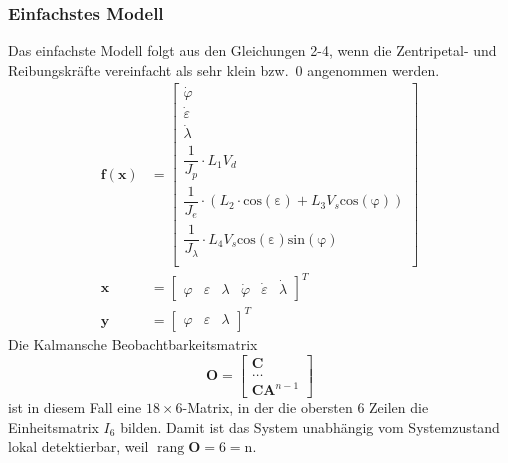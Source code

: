 \documentclass[times, 9pt,twocolumn]{article}
\DeclareMathOperator{\rang}{rang}
\begin{document}
	\subsubsection{Einfachstes Modell}
	Das einfachste Modell folgt aus den Gleichungen 2-4, wenn die Zentripetal- und Reibungskräfte vereinfacht als sehr klein bzw.\ 0 angenommen werden.
	\begin{align*}
	\bm f(\bm x) &= \begin{bmatrix}
	\dot \varphi \\
	\dot \varepsilon \\
	\dot \lambda  \\
	\dfrac{1}{J_p} \cdot L_1 V_d \\
	\dfrac{1}{J_e} \cdot (L_2 \cdot \mathrm{cos(\varepsilon)} + L_3 V_s \mathrm{cos(\varphi)}) \\
	\dfrac{1}{J_{\lambda}} \cdot L_4 V_s \mathrm{cos(\varepsilon)} \mathrm{sin(\varphi)} \\
	\end{bmatrix}\\
	\bm x &= \begin{bmatrix}
	\varphi & \varepsilon & \lambda & \dot \varphi & \dot \varepsilon & \dot \lambda 
	\end{bmatrix}^T \\
	\bm y &= \begin{bmatrix}
	\varphi & \varepsilon & \lambda 
	\end{bmatrix}^T
\end{align*}
	Die Kalmansche Beobachtbarkeitsmatrix
	$$\bm O = \begin{bmatrix}
	\bm C \\
	\ldots \\
	\bm C \bm A^{n-1}
	\end{bmatrix}$$
	ist in diesem Fall eine $18\times 6$-Matrix, in der die obersten 6 Zeilen die Einheitsmatrix $I_6$ bilden.
	Damit ist das System unabhängig vom Systemzustand lokal detektierbar, weil $\rang \bm O = 6 = \mathrm{n}$.
\end{document}
